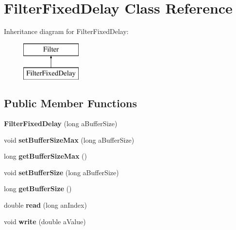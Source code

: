 \hypertarget{class_filter_fixed_delay}{\section{Filter\-Fixed\-Delay Class Reference}
\label{class_filter_fixed_delay}
}
Inheritance diagram for Filter\-Fixed\-Delay\-:\begin{figure}[H]
\begin{center}
\leavevmode
\includegraphics[height=2.000000cm]{class_filter_fixed_delay}
\end{center}
\end{figure}
\subsection*{Public Member Functions}
\begin{DoxyCompactItemize}
\item 
\hypertarget{class_filter_fixed_delay_acb3475c949445f1179cb5b17055e5312}{{\bfseries Filter\-Fixed\-Delay} (long a\-Buffer\-Size)}\label{class_filter_fixed_delay_acb3475c949445f1179cb5b17055e5312}

\item 
\hypertarget{class_filter_fixed_delay_aa1e8a10653689a512916094f378cb661}{void {\bfseries set\-Buffer\-Size\-Max} (long a\-Buffer\-Size)}\label{class_filter_fixed_delay_aa1e8a10653689a512916094f378cb661}

\item 
\hypertarget{class_filter_fixed_delay_a69f4c712bece5f7a6b15b5a4715a2167}{long {\bfseries get\-Buffer\-Size\-Max} ()}\label{class_filter_fixed_delay_a69f4c712bece5f7a6b15b5a4715a2167}

\item 
\hypertarget{class_filter_fixed_delay_a14558b513c2f9dac8f0dbb7cd6264e31}{void {\bfseries set\-Buffer\-Size} (long a\-Buffer\-Size)}\label{class_filter_fixed_delay_a14558b513c2f9dac8f0dbb7cd6264e31}

\item 
\hypertarget{class_filter_fixed_delay_ac91f32a7010d7118b6c2513aa090a56c}{long {\bfseries get\-Buffer\-Size} ()}\label{class_filter_fixed_delay_ac91f32a7010d7118b6c2513aa090a56c}

\item 
\hypertarget{class_filter_fixed_delay_a7632b4def4ca6e21d01e5c11142225e7}{double {\bfseries read} (long an\-Index)}\label{class_filter_fixed_delay_a7632b4def4ca6e21d01e5c11142225e7}

\item 
\hypertarget{class_filter_fixed_delay_ad4a8e14f9e0f8752876cf661345b9ff4}{void {\bfseries write} (double a\-Value)}\label{class_filter_fixed_delay_ad4a8e14f9e0f8752876cf661345b9ff4}

\end{DoxyCompactItemize}
